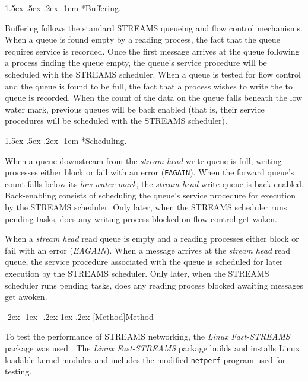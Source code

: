 \documentclass[letterpaper,final,notitlepage,twocolumn,10pt,twoside]{article}
\makeatletter
\renewcommand\section{\@startsection {section}{1}{\z@}%
                                   {-2ex \@plus -1ex \@minus -.2ex}%
                                   {1ex \@plus .2ex}%
                                   {\normalfont\large\bfseries}}
\renewcommand\paragraph{\@startsection{paragraph}{4}{\z@}%
                                    {1.5ex \@plus .5ex \@minus .2ex}%
                                    {-1em}%
                                    {\normalfont\normalsize\bfseries\slshape}}
\makeatother
\begin{document}
\paragraph*{Buffering.}

Buffering follows the standard STREAMS queueing and flow control mechanisms.
When a queue is found empty by a reading process, the fact that the queue
requires service is recorded.  Once the first message arrives at the queue
following a process finding the queue empty, the queue's service procedure
will be scheduled with the STREAMS scheduler.  When a queue is tested for flow
control and the queue is found to be full, the fact that a process wishes to
write the to queue is recorded.  When the count of the data on the queue falls
beneath the low water mark, previous queues will be back enabled (that is,
their service procedures will be scheduled with the STREAMS scheduler).

\paragraph*{Scheduling.}

When a queue downstream from the \textit{stream head} write queue is full,
writing processes either block or fail with an error (\texttt{EAGAIN}).  When
the forward queue's count falls below its \textit{low water mark}, the
\textit{stream head} write queue is back-enabled.  Back-enabling consists of
scheduling the queue's service procedure for execution by the STREAMS
scheduler.  Only later, when the STREAMS scheduler runs pending tasks, does
any writing process blocked on flow control get woken.

When a \textit{stream head} read queue is empty and a reading processes either
block or fail with an error (\textit{EAGAIN}).  When a message arrives at the
\textit{stream head} read queue, the service procedure associated with the
queue is scheduled for later execution by the STREAMS scheduler.  Only later,
when the STREAMS scheduler runs pending tasks, does any reading process
blocked awaiting messages get awoken.

\section[Method]{Method}

To test the performance of STREAMS networking, the \textsl{Linux Fast-STREAMS}
package was used \cite[]{LfS}.  The \textsl{Linux Fast-STREAMS} package builds
and installs Linux loadable kernel modules and includes the modified
\texttt{netperf} program used for testing.
\end{document}
